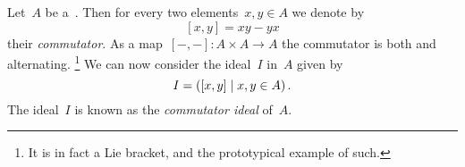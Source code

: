 %     

Let~$A$ be a~{\kalg}.
Then for every two elements~$x, y \in A$ we denote by
\[
    [x,y]
  = xy - yx
\]
their \emph{commutator}.
As a map~$[-,-] \colon A \times A \to A$ the commutator is both {\kbil} and alternating.%
\footnote{It is in fact a Lie bracket, and the prototypical example of such.}
We can now consider the {\twosided} ideal~$I$ in~$A$ given by
\[
    I
  = \genideal{ [x,y] \suchthat x, y \in A } \,.
\]
The ideal~$I$ is known as the \emph{commutator ideal} of~$A$.

